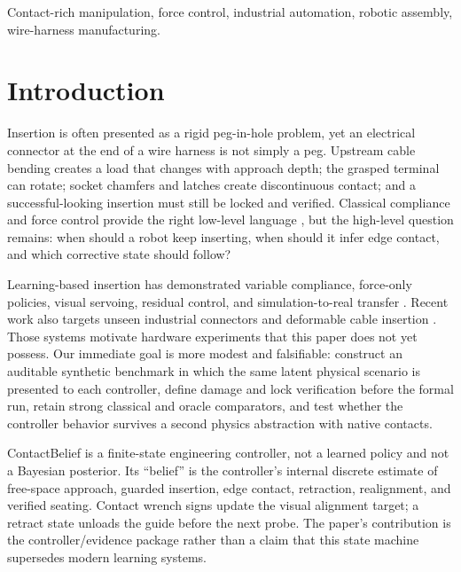 \documentclass[journal]{IEEEtran}
\begin{document}
\begin{IEEEkeywords}
Contact-rich manipulation, force control, industrial automation, robotic
assembly, wire-harness manufacturing.
\end{IEEEkeywords}

\section{Introduction}

Insertion is often presented as a rigid peg-in-hole problem, yet an electrical
connector at the end of a wire harness is not simply a peg.  Upstream cable
bending creates a load that changes with approach depth; the grasped terminal
can rotate; socket chamfers and latches create discontinuous contact; and a
successful-looking insertion must still be locked and verified.  Classical
compliance and force control provide the right low-level language
\cite{whitney1982quasistatic,hogan1985impedance}, but the high-level question
remains: when should a robot keep inserting, when should it infer edge contact,
and which corrective state should follow?

Learning-based insertion has demonstrated variable compliance, force-only
policies, visual servoing, residual control, and simulation-to-real transfer
\cite{beltran2020variable,markert2023force,haugaard2021visual,
johannink2019residual,tang2023industreal}.  Recent work also targets unseen
industrial connectors and deformable cable insertion
\cite{nair2022learning,wu2025dloassembly}.  Those systems motivate hardware
experiments that this paper does not yet possess.  Our immediate goal is more
modest and falsifiable: construct an auditable synthetic benchmark in which the
same latent physical scenario is presented to each controller, define damage
and lock verification before the formal run, retain strong classical and oracle
comparators, and test whether the controller behavior survives a second physics
abstraction with native contacts.

ContactBelief is a finite-state engineering controller, not a learned policy and
not a Bayesian posterior.  Its ``belief'' is the controller's internal discrete
estimate of free-space approach, guarded insertion, edge contact, retraction,
realignment, and verified seating.  Contact wrench signs update the visual
alignment target; a retract state unloads the guide before the next probe.  The
paper's contribution is the controller/evidence package rather than a claim that
this state machine supersedes modern learning systems.
\end{document}
